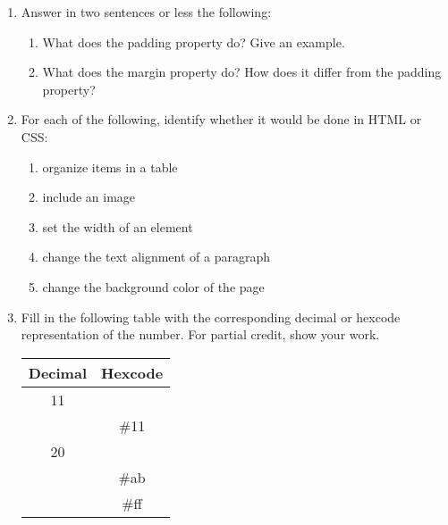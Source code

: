 {{\begin{enumerate}
\item Answer in two sentences or less the following:
\begin{enumerate}
    \item What does the padding property do? Give an example. 
    	\vspace{1.2in}
    \item What does the margin property do? How does it differ from the padding property? 	
    	\vspace{1in}
\end{enumerate}     

     \item For each of the following, identify whether it would be done in HTML or CSS:	\begin{enumerate}
	\itemsep 0pt
		\item \underline{\hspace{.5in}}  organize items in a table
		\item  \underline{\hspace{.5in}} include an image
		\item  \underline{\hspace{.5in}} set the width of an element
		\item  \underline{\hspace{.5in}}  change the text alignment of a paragraph
		\item  \underline{\hspace{.5in}}  change the background color of the page
	\end{enumerate}
     

\newpage
     \item Fill in the following table with the corresponding decimal or hexcode representation of the 
     	number.  For partial credit, show your work.
	
	{\large
		\begin{tabular}{|c|c|}
			\hline
			{\bf Decimal} & {\bf Hexcode}\\
			\hline
			11 & \\
			\hline
			& \#11\\
			\hline
			20 & \\
			\hline
			& \#ab\\
			\hline
			& \#ff\\
			\hline
		\end{tabular}
     	}
	\vspace{1in}


\end{enumerate}}}
